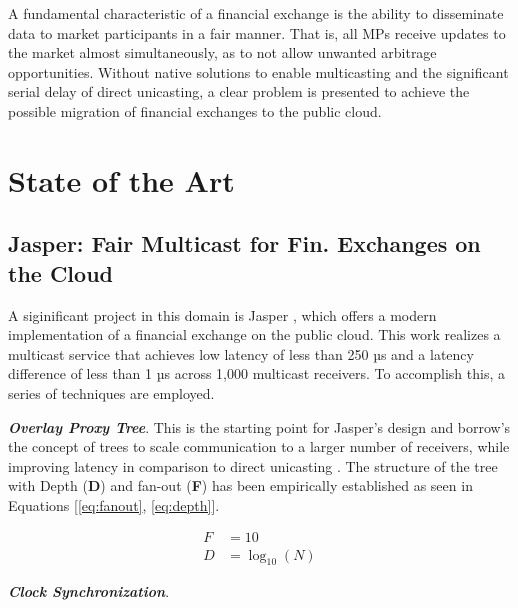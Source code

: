 A fundamental characteristic of a financial exchange is the ability to disseminate data
    to market participants in a fair manner. 
That is, all MPs receive updates to the market almost simultaneously, as to not allow 
    unwanted arbitrage opportunities.
Without native solutions to enable multicasting and the significant serial 
    delay of direct unicasting, a clear problem is presented 
    to achieve the possible migration of financial exchanges to the public cloud.

\section{State of the Art}
\subsection{Jasper: Fair Multicast for Fin. Exchanges on the Cloud}
A siginificant project in this domain is Jasper \cite{jasper}, which offers 
a modern implementation of a financial exchange on the public cloud. 
This work realizes a multicast service that achieves low latency of less than 
250 µs and a latency difference of less than 1 µs across 1,000 multicast receivers.
To accomplish this, a series of techniques are employed.


\textbf{\textit{Overlay Proxy Tree}}. This is the starting point for Jasper's design 
    and borrow's the concept of trees to scale communication to a larger number of 
    receivers, while improving latency in comparison to direct unicasting \cite{matsuoka, twotree}.
    The structure of the tree with Depth (\textbf{D}) and fan-out (\textbf{F}) has been empirically established 
    as seen in Equations [\ref{eq:fanout}, \ref{eq:depth}].

\begin{align}
F &= 10 \label{eq:fanout} \\
D &= \log_{10}{(N)} \label{eq:depth}
\end{align}

\textbf{\textit{Clock Synchronization}}. \cite{hyugens}

